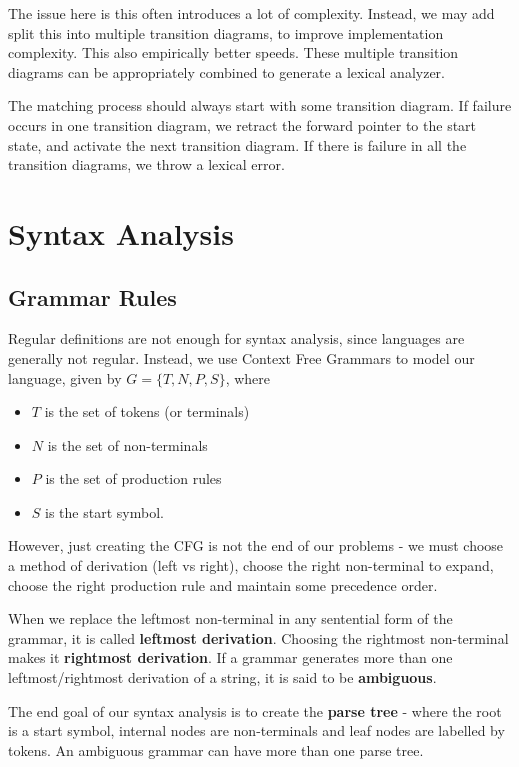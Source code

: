 \documentclass[12pt,letterpaper]{amsbook}
\theoremstyle{definition}
\begin{document}
The issue here is this often introduces a lot of complexity. Instead, we may add split this into multiple transition diagrams, to improve implementation complexity. This also empirically better speeds. These multiple transition diagrams can be appropriately combined to generate a lexical analyzer.

The matching process should always start with some transition diagram. If failure occurs in one transition diagram, we retract the forward pointer to the start state, and activate the next transition diagram. If there is failure in all the transition diagrams, we throw a lexical error.

\chapter{Syntax Analysis}

\section{Grammar Rules}

Regular definitions are not enough for syntax analysis, since languages are generally not regular. Instead, we use Context Free Grammars to model our language, given by $G = \{T,N,P,S\}$, where

\begin{itemize}
  \item $T$ is the set of tokens (or terminals)
  \item $N$ is the set of non-terminals
  \item $P$ is the set of production rules
  \item $S$ is the start symbol.
\end{itemize}

However, just creating the CFG is not the end of our problems - we must choose a method of derivation (left vs right), choose the right non-terminal to expand, choose the right production rule and maintain some precedence order.

When we replace the leftmost non-terminal in any sentential form of the grammar, it is called \textbf{leftmost derivation}. Choosing the rightmost non-terminal makes it \textbf{rightmost derivation}. If a grammar generates more than one leftmost/rightmost derivation of a string, it is said to be \textbf{ambiguous}.

The end goal of our syntax analysis is to create the \textbf{parse tree} - where the root is a start symbol, internal nodes are non-terminals and leaf nodes are labelled by tokens. An ambiguous grammar can have more than one parse tree.
\end{document}
